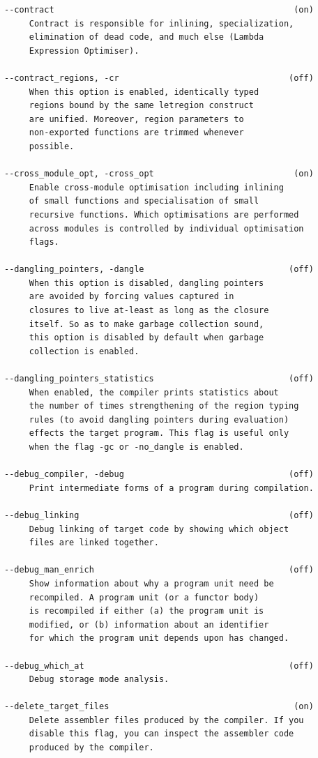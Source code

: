 \documentclass[12pt]{book}
\begin{document}
\begin{verbatim}
--contract                                                (on)
     Contract is responsible for inlining, specialization,
     elimination of dead code, and much else (Lambda
     Expression Optimiser).

--contract_regions, -cr                                  (off)
     When this option is enabled, identically typed
     regions bound by the same letregion construct
     are unified. Moreover, region parameters to
     non-exported functions are trimmed whenever
     possible.

--cross_module_opt, -cross_opt                            (on)
     Enable cross-module optimisation including inlining
     of small functions and specialisation of small
     recursive functions. Which optimisations are performed
     across modules is controlled by individual optimisation
     flags.

--dangling_pointers, -dangle                             (off)
     When this option is disabled, dangling pointers
     are avoided by forcing values captured in
     closures to live at-least as long as the closure
     itself. So as to make garbage collection sound,
     this option is disabled by default when garbage
     collection is enabled.

--dangling_pointers_statistics                           (off)
     When enabled, the compiler prints statistics about
     the number of times strengthening of the region typing
     rules (to avoid dangling pointers during evaluation)
     effects the target program. This flag is useful only
     when the flag -gc or -no_dangle is enabled.

--debug_compiler, -debug                                 (off)
     Print intermediate forms of a program during compilation.

--debug_linking                                          (off)
     Debug linking of target code by showing which object
     files are linked together.

--debug_man_enrich                                       (off)
     Show information about why a program unit need be
     recompiled. A program unit (or a functor body)
     is recompiled if either (a) the program unit is
     modified, or (b) information about an identifier
     for which the program unit depends upon has changed.

--debug_which_at                                         (off)
     Debug storage mode analysis.

--delete_target_files                                     (on)
     Delete assembler files produced by the compiler. If you
     disable this flag, you can inspect the assembler code
     produced by the compiler.


\end{verbatim}
\end{document}
